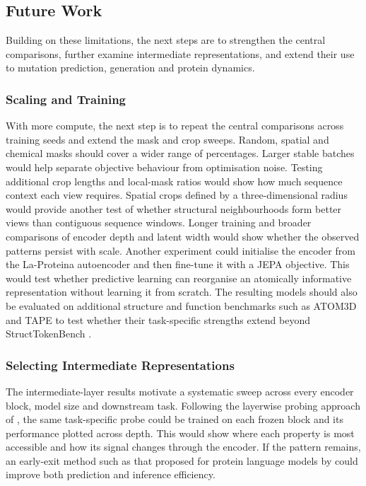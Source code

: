 \subsection{Future Work}
\label{sec:future-work}

Building on these limitations, the next steps are to strengthen the central comparisons, further examine intermediate representations, and extend their use to mutation prediction, generation and protein dynamics.

\subsubsection{Scaling and Training}

With more compute, the next step is to repeat the central comparisons across training seeds and extend the mask and crop sweeps. Random, spatial and chemical masks should cover a wider range of percentages. Larger stable batches would help separate objective behaviour from optimisation noise. Testing additional crop lengths and local-mask ratios would show how much sequence context each view requires. Spatial crops defined by a three-dimensional radius would provide another test of whether structural neighbourhoods form better views than contiguous sequence windows. Longer training and broader comparisons of encoder depth and latent width would show whether the observed patterns persist with scale. Another experiment could initialise the encoder from the La-Proteina autoencoder and then fine-tune it with a JEPA objective. This would test whether predictive learning can reorganise an atomically informative representation without learning it from scratch. The resulting models should also be evaluated on additional structure and function benchmarks such as ATOM3D and TAPE to test whether their task-specific strengths extend beyond StructTokenBench \citep{townshend2020atom3d,rao2019tape}.

\subsubsection{Selecting Intermediate Representations}

The intermediate-layer results motivate a systematic sweep across every encoder block, model size and downstream task. Following the layerwise probing approach of \citet{joeres2026taskdataset}, the same task-specific probe could be trained on each frozen block and its performance plotted across depth. This would show where each property is most accessible and how its signal changes through the encoder. If the pattern remains, an early-exit method such as that proposed for protein language models by \citet{hart2026protein} could improve both prediction and inference efficiency.


